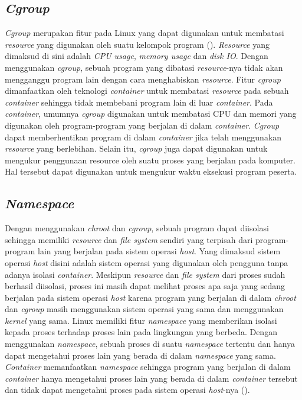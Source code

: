 \subsection{\textit{Cgroup}}


\par \textit{Cgroup} merupakan fitur pada Linux yang dapat digunakan untuk membatasi \textit{resource} yang digunakan oleh suatu kelompok program (\cite{wfeltervmcontainer}). \textit{Resource} yang dimaksud di sini adalah \textit{CPU usage}, \textit{memory usage} dan \textit{disk IO}. Dengan menggunakan \textit{cgroup}, sebuah program yang dibatasi \textit{resource}-nya tidak akan mengganggu program lain dengan cara menghabiskan \textit{resource}. Fitur \textit{cgroup} dimanfaatkan oleh teknologi \textit{container} untuk membatasi \textit{resource} pada sebuah \textit{container} sehingga tidak membebani program lain di luar \textit{container}. Pada \textit{container}, umumnya \textit{cgroup} digunakan untuk membatasi CPU dan memori yang digunakan oleh program-program yang berjalan di dalam \textit{container}. \textit{Cgroup} dapat memberhentikan program di dalam \textit{container} jika telah menggunakan \textit{resource} yang berlebihan. Selain itu, \textit{cgroup} juga dapat digunakan untuk mengukur penggunaan resource oleh suatu proses yang berjalan pada komputer. Hal tersebut dapat digunakan untuk mengukur waktu eksekusi program peserta.

\subsection{\textit{Namespace}}

\par Dengan menggunakan \textit{chroot} dan \textit{cgroup}, sebuah program dapat diisolasi sehingga memiliki \textit{resource} dan \textit{file system} sendiri yang terpisah dari program-program lain yang berjalan pada sistem operasi \textit{host}. Yang dimaksud sistem operasi \textit{host} disini adalah sistem operasi yang digunakan oleh pengguna tanpa adanya isolasi \textit{container}. Meskipun \textit{resource} dan \textit{file system} dari proses sudah berhasil diisolasi, proses ini masih dapat melihat proses apa saja yang sedang berjalan pada sistem operasi \textit{host} karena program yang berjalan di dalam \textit{chroot} dan \textit{cgroup} masih menggunakan sistem operasi yang sama dan menggunakan \textit{kernel} yang sama. Linux memiliki fitur \textit{namespace} yang memberikan isolasi kepada proses terhadap proses lain pada lingkungan yang berbeda. Dengan menggunakan \textit{namespace}, sebuah proses di suatu \textit{namespace} tertentu dan hanya dapat mengetahui proses lain yang berada di dalam \textit{namespace} yang sama. \textit{Container} memanfaatkan \textit{namespace} sehingga program yang berjalan di dalam \textit{container} hanya mengetahui proses lain yang berada di dalam \textit{container} tersebut dan tidak dapat mengetahui proses pada sistem operasi \textit{host}-nya (\cite{wfeltervmcontainer}).

